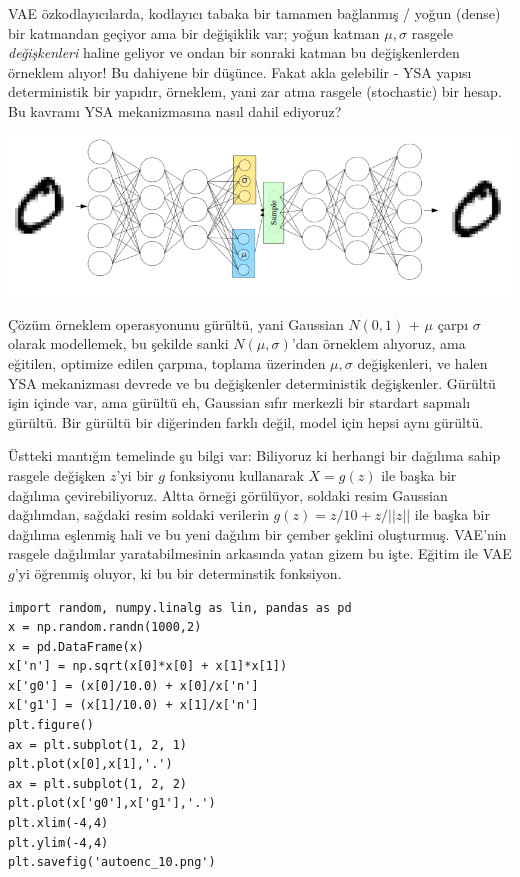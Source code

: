 \documentclass[12pt,fleqn]{article}\usepackage{../../common}
\begin{document}
VAE özkodlayıcılarda, kodlayıcı tabaka bir tamamen bağlanmış / yoğun
(dense) bir katmandan geçiyor ama bir değişiklik var; yoğun katman
$\mu,\sigma$ rasgele {\em değişkenleri} haline geliyor ve ondan bir sonraki
katman bu değişkenlerden örneklem alıyor! Bu dahiyene bir düşünce. Fakat
akla gelebilir - YSA yapısı deterministik bir yapıdır, örneklem, yani zar
atma rasgele (stochastic) bir hesap. Bu kavramı YSA mekanizmasına nasıl
dahil ediyoruz?

\includegraphics[width=40em]{autoenc_06.png}

Çözüm örneklem operasyonunu gürültü, yani Gaussian $N(0,1)$ + $\mu$ çarpı
$\sigma$ olarak modellemek, bu şekilde sanki $N(\mu,\sigma)$'dan örneklem
alıyoruz, ama eğitilen, optimize edilen çarpma, toplama üzerinden
$\mu,\sigma$ değişkenleri, ve halen YSA mekanizması devrede ve bu
değişkenler deterministik değişkenler. Gürültü işin içinde var, ama gürültü
eh, Gaussian sıfır merkezli bir stardart sapmalı gürültü. Bir gürültü bir
diğerinden farklı değil, model için hepsi aynı gürültü.

Üstteki mantığın temelinde şu bilgi  var: Biliyoruz ki herhangi bir
dağılıma sahip rasgele değişken $z$'yi bir $g$ fonksiyonu kullanarak
$X=g(z)$ ile başka bir dağılıma çevirebiliyoruz. Altta örneği görülüyor,
soldaki resim Gaussian dağılımdan, sağdaki resim soldaki verilerin
$g(z) = z/10 + z/||z||$ ile başka bir dağılıma eşlenmiş hali ve bu yeni
dağılım bir çember şeklini oluşturmuş. VAE'nin rasgele dağılımlar
yaratabilmesinin arkasında yatan gizem bu işte. Eğitim ile VAE $g$'yi
öğrenmiş oluyor, ki bu bir determinstik fonksiyon.

\begin{verbatim}
import random, numpy.linalg as lin, pandas as pd
x = np.random.randn(1000,2)
x = pd.DataFrame(x)
x['n'] = np.sqrt(x[0]*x[0] + x[1]*x[1])
x['g0'] = (x[0]/10.0) + x[0]/x['n']
x['g1'] = (x[1]/10.0) + x[1]/x['n']
plt.figure()
ax = plt.subplot(1, 2, 1)
plt.plot(x[0],x[1],'.')
ax = plt.subplot(1, 2, 2)
plt.plot(x['g0'],x['g1'],'.')
plt.xlim(-4,4)
plt.ylim(-4,4)
plt.savefig('autoenc_10.png')
\end{verbatim}
\end{document}
